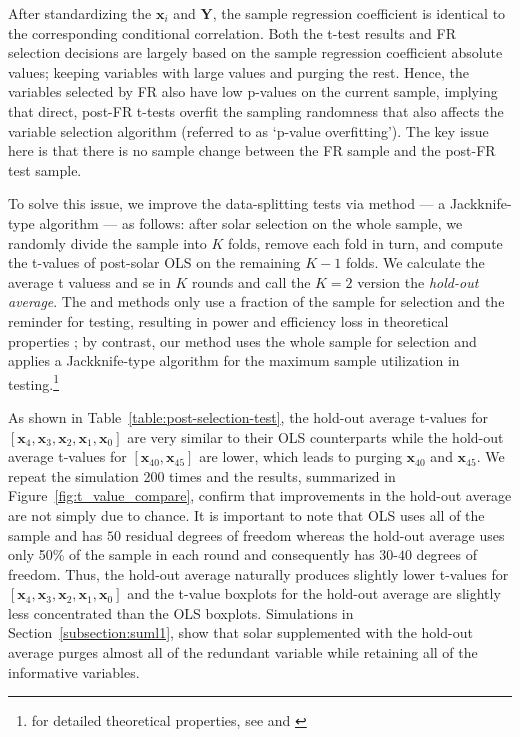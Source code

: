 \documentclass[12pt]{article}
\begin{document}
After standardizing the $\mathbf{x}_i$ and $\mathbf{Y}$, the sample regression coefficient is identical to the corresponding conditional correlation. Both the t-test results and FR selection decisions are largely based on the sample regression coefficient absolute values; keeping variables with large values and purging the rest. Hence, the variables selected by FR also have low p-values on the current sample, implying that direct, post-FR t-tests overfit the sampling randomness that also affects the variable selection algorithm (referred to as `p-value overfitting'). The key issue here is that there is no sample change between the FR sample and the post-FR test sample.

To solve this issue, we improve the data-splitting tests via \citet{bousquet2002stability} method --- a Jackknife-type algorithm --- as follows: after solar selection on the whole sample, we randomly divide the sample into $K$ folds, remove each fold in turn, and compute the t-values of post-solar OLS on the remaining $K-1$ folds. We calculate the average t valuess and se in $K$ rounds and call the $K=2$ version the \emph{hold-out average}. The \citet{wasserman2009high} and \citet{meinshausen2009p} methods only use a fraction of the sample for selection and the reminder for testing, resulting in power and efficiency loss in theoretical properties \citet{bousquet2002stability}; by contrast, our method uses the whole sample for selection and applies a Jackknife-type algorithm for the maximum sample utilization in testing.\footnote{for detailed theoretical properties, see \citet{bousquet2002stability} and \citet{diciccio2020exact}}

As shown in Table~\ref{table:post-selection-test}, the hold-out average t-values for $\left[\mathbf{x}_4, \mathbf{x}_3, \mathbf{x}_2, \mathbf{x}_1, \mathbf{x}_0\right]$ are very similar to their OLS counterparts while the hold-out average t-values for $\left[\mathbf{x}_{40}, \mathbf{x}_{45} \right]$ are lower, which leads to purging $\mathbf{x}_{40}$ and $\mathbf{x}_{45}$. We repeat the simulation 200 times and the results, summarized in Figure~\ref{fig:t_value_compare}, confirm that improvements in the hold-out average are not simply due to chance. It is important to note that OLS uses all of the sample and has $50$ residual degrees of freedom whereas the hold-out average uses only 50\% of the sample in each round and consequently has $30$-$40$ degrees of freedom. Thus, the hold-out average naturally produces slightly lower t-values for $\left[\mathbf{x}_4, \mathbf{x}_3, \mathbf{x}_2, \mathbf{x}_1, \mathbf{x}_0\right]$ and the t-value boxplots for the hold-out average are slightly less concentrated than the OLS boxplots. Simulations in Section~\ref{subsection:suml1}, show that solar supplemented with the hold-out average purges almost all of the redundant variable while retaining all of the informative variables.
\end{document}
